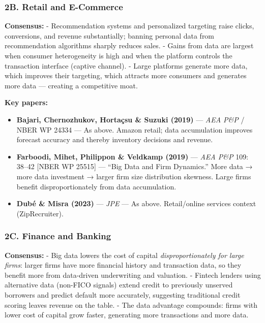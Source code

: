 \documentclass[
]{article}
\providecommand{\tightlist}{%
  \setlength{\itemsep}{0pt}\setlength{\parskip}{0pt}}
\begin{document}
\hypertarget{b.-retail-and-e-commerce}{%
\subsubsection{2B. Retail and
E-Commerce}\label{b.-retail-and-e-commerce}}

\textbf{Consensus:} - Recommendation systems and personalized targeting
raise clicks, conversions, and revenue substantially; banning personal
data from recommendation algorithms sharply reduces sales. - Gains from
data are largest when consumer heterogeneity is high and when the
platform controls the transaction interface (captive channel). - Large
platforms generate more data, which improves their targeting, which
attracts more consumers and generates more data --- creating a
competitive moat.

\textbf{Key papers:}

\begin{itemize}
\tightlist
\item
  \textbf{Bajari, Chernozhukov, Hortaçsu \& Suzuki (2019)} --- \emph{AEA
  P\&P} / NBER WP 24334 --- As above. Amazon retail; data accumulation
  improves forecast accuracy and thereby inventory decisions and
  revenue.
\item
  \textbf{Farboodi, Mihet, Philippon \& Veldkamp (2019)} --- \emph{AEA
  P\&P} 109: 38--42 {[}NBER WP 25515{]} --- ``Big Data and Firm
  Dynamics.'' More data → more data investment → larger firm size
  distribution skewness. Large firms benefit disproportionately from
  data accumulation.
\item
  \textbf{Dubé \& Misra (2023)} --- \emph{JPE} --- As above.
  Retail/online services context (ZipRecruiter).
\end{itemize}

\hypertarget{c.-finance-and-banking}{%
\subsubsection{2C. Finance and Banking}\label{c.-finance-and-banking}}

\textbf{Consensus:} - Big data lowers the cost of capital
\emph{disproportionately for large firms}: larger firms have more
financial history and transaction data, so they benefit more from
data-driven underwriting and valuation. - Fintech lenders using
alternative data (non-FICO signals) extend credit to previously unserved
borrowers and predict default more accurately, suggesting traditional
credit scoring leaves revenue on the table. - The data advantage
compounds: firms with lower cost of capital grow faster, generating more
transactions and more data.
\end{document}
